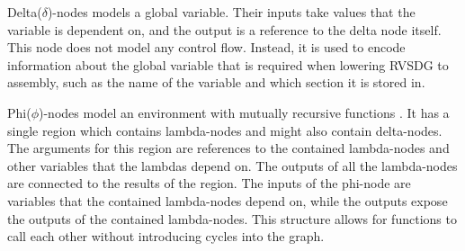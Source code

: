 \label{lbl:delta-node}
Delta($\delta$)-nodes models a global variable. Their inputs take values that the variable is dependent on, and the output is a reference to the delta node itself. This node does not model any control flow. Instead, it is used to encode information about the global variable that is required when lowering RVSDG to assembly, such as the name of the variable and which section it is stored in.


\label{lbl:phi-node}
Phi($\phi$)-nodes model an environment with mutually recursive functions \cite{Reissmann2020}. It has a single region which contains lambda-nodes and might also contain delta-nodes. The arguments for this region are references to the contained lambda-nodes and other variables that the lambdas depend on. The outputs of all the lambda-nodes are connected to the results of the region. The inputs of the phi-node are variables that the contained lambda-nodes depend on, while the outputs expose the outputs of the contained lambda-nodes. This structure allows for functions to call each other without introducing cycles into the graph.
